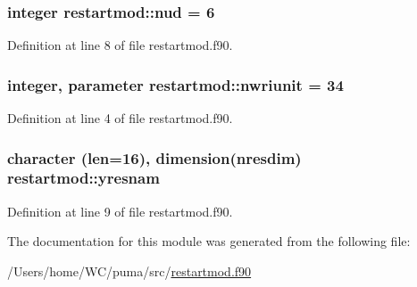\hypertarget{classrestartmod_a8a3daeed29c348b61636e5e6994b9a28}{
\subsubsection[{nud}]{\setlength{\rightskip}{0pt plus 5cm}integer {\bf restartmod\-::nud} = 6}}
\label{classrestartmod_a8a3daeed29c348b61636e5e6994b9a28}


\-Definition at line 8 of file restartmod.\-f90.

\hypertarget{classrestartmod_af19c3e29c219ca79f3ab6b6b18df1f41}{
\subsubsection[{nwriunit}]{\setlength{\rightskip}{0pt plus 5cm}integer, parameter {\bf restartmod\-::nwriunit} = 34}}
\label{classrestartmod_af19c3e29c219ca79f3ab6b6b18df1f41}


\-Definition at line 4 of file restartmod.\-f90.

\hypertarget{classrestartmod_a7a18509625928d4fe3a5d1f5033589ab}{
\subsubsection[{yresnam}]{\setlength{\rightskip}{0pt plus 5cm}character (len=16), dimension({\bf nresdim}) {\bf restartmod\-::yresnam}}}
\label{classrestartmod_a7a18509625928d4fe3a5d1f5033589ab}


\-Definition at line 9 of file restartmod.\-f90.



\-The documentation for this module was generated from the following file\-:\begin{DoxyCompactItemize}
\item 
/\-Users/home/\-W\-C/puma/src/\hyperlink{restartmod_8f90}{restartmod.\-f90}\end{DoxyCompactItemize}

